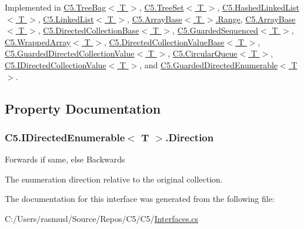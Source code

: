 Implemented in \hyperlink{class_c5_1_1_tree_bag_aa8d9bd7240bf759fc52c3a14b1f2e43a}{C5.\+Tree\+Bag$<$ T $>$}, \hyperlink{class_c5_1_1_tree_set_a27bc1208dc4fb8e7e1e3be048354ec7b}{C5.\+Tree\+Set$<$ T $>$}, \hyperlink{class_c5_1_1_hashed_linked_list_ad0fbbf15338c5aae4278a5e44f8d9c69}{C5.\+Hashed\+Linked\+List$<$ T $>$}, \hyperlink{class_c5_1_1_linked_list_aa96b744c5e2f0db894b8c9ed9606c240}{C5.\+Linked\+List$<$ T $>$}, \hyperlink{class_c5_1_1_array_base_1_1_range_a296cf1453eb618368fdc14f7abc4f4c2}{C5.\+Array\+Base$<$ T $>$.\+Range}, \hyperlink{class_c5_1_1_array_base_a11fbdc5f71bb41de404f3bd91e3a92b3}{C5.\+Array\+Base$<$ T $>$}, \hyperlink{class_c5_1_1_directed_collection_base_a9a4c7d6571ff7d78ea5adcb0d8264ff1}{C5.\+Directed\+Collection\+Base$<$ T $>$}, \hyperlink{class_c5_1_1_guarded_sequenced_a5bbddf444037001d526931116e6b16e7}{C5.\+Guarded\+Sequenced$<$ T $>$}, \hyperlink{class_c5_1_1_wrapped_array_a2039f22afabd1b152a48ed687dd4e13a}{C5.\+Wrapped\+Array$<$ T $>$}, \hyperlink{class_c5_1_1_directed_collection_value_base_a66d4222e083371d053e609efeecac740}{C5.\+Directed\+Collection\+Value\+Base$<$ T $>$}, \hyperlink{class_c5_1_1_guarded_directed_collection_value_a14e2ad2eb0afbaf5e1ad2e970db81a5b}{C5.\+Guarded\+Directed\+Collection\+Value$<$ T $>$}, \hyperlink{class_c5_1_1_circular_queue_a9df19a0a07cd854a59df4d3f976cf169}{C5.\+Circular\+Queue$<$ T $>$}, \hyperlink{interface_c5_1_1_i_directed_collection_value_ae5665ed396ea2801266c4b2bfb3dae41}{C5.\+I\+Directed\+Collection\+Value$<$ T $>$}, and \hyperlink{class_c5_1_1_guarded_directed_enumerable_a858ca7e55fc0cf083c967e31d9beb8eb}{C5.\+Guarded\+Directed\+Enumerable$<$ T $>$}.



\subsection{Property Documentation}
\hypertarget{interface_c5_1_1_i_directed_enumerable_a4a9d0a85c70671db551d4d0c6efe8564}{}
\subsubsection[{Direction}]{ {\bf C5.\+I\+Directed\+Enumerable}$<$ T $>$.Direction\hspace{0.3cm}{\ttfamily [get]}}\label{interface_c5_1_1_i_directed_enumerable_a4a9d0a85c70671db551d4d0c6efe8564}




{\ttfamily Forwards} if same, else {\ttfamily Backwards} 

The enumeration direction relative to the original collection.

The documentation for this interface was generated from the following file\+:\begin{DoxyCompactItemize}
\item 
C\+:/\+Users/rasmusl/\+Source/\+Repos/\+C5/\+C5/\hyperlink{_interfaces_8cs}{Interfaces.\+cs}\end{DoxyCompactItemize}
